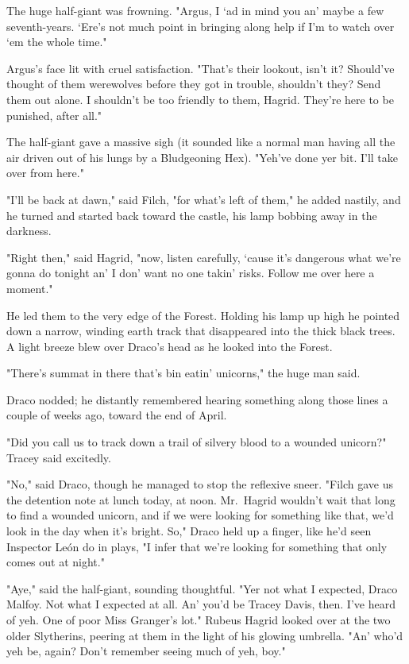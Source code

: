 The huge half-giant was frowning. "Argus, I `ad in mind you an' maybe a few
seventh-years. `Ere's not much point in bringing along help if I'm to watch
over `em the whole time."

Argus's face lit with cruel satisfaction. "That's their lookout, isn't it?
Should've thought of them werewolves before they got in trouble, shouldn't
they? Send them out alone. I shouldn't be too friendly to them, Hagrid. They're
here to be punished, after all."

The half-giant gave a massive sigh (it sounded like a normal man having all the
air driven out of his lungs by a Bludgeoning Hex). "Yeh've done yer bit. I'll
take over from here."

"I'll be back at dawn," said Filch, "for what's left of them," he added
nastily, and he turned and started back toward the castle, his lamp bobbing
away in the darkness.

"Right then," said Hagrid, "now, listen carefully, `cause it's dangerous what
we're gonna do tonight an' I don' want no one takin' risks. Follow me over here
a moment."

He led them to the very edge of the Forest. Holding his lamp up high he pointed
down a narrow, winding earth track that disappeared into the thick black trees.
A light breeze blew over Draco's head as he looked into the Forest.

"There's summat in there that's bin eatin' unicorns," the huge man said.

Draco nodded; he distantly remembered hearing something along those lines a
couple of weeks ago, toward the end of April.

"Did you call us to track down a trail of silvery blood to a wounded unicorn?"
Tracey said excitedly.

"No," said Draco, though he managed to stop the reflexive sneer. "Filch gave us
the detention note at lunch today, at noon. Mr.~Hagrid wouldn't wait that long
to find a wounded unicorn, and if we were looking for something like that, we'd
look in the day when it's bright. So," Draco held up a finger, like he'd seen
Inspector León do in plays, "I infer that we're looking for something that only
comes out at night."

"Aye," said the half-giant, sounding thoughtful. "Yer not what I expected,
Draco Malfoy. Not what I expected at all. An' you'd be Tracey Davis, then. I've
heard of yeh. One of poor Miss Granger's lot." Rubeus Hagrid looked over at the
two older Slytherins, peering at them in the light of his glowing umbrella.
"An' who'd yeh be, again? Don't remember seeing much of yeh, boy."

